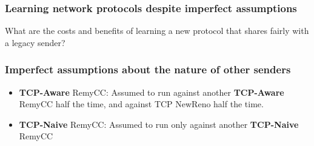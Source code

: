 \begin{frame}
\frametitle{Learning network protocols despite imperfect assumptions}
\begin{centering}
What are the costs and benefits of learning a new protocol that shares fairly with a legacy sender?
\end{centering}
\end{frame}

\begin{frame}
\frametitle{Imperfect assumptions about the nature of other senders}
\begin{itemize}
\item<1-> \textbf{TCP-Aware} RemyCC: Assumed to run against another \textbf{TCP-Aware} RemyCC half the time, and against TCP NewReno half the time.
\item<2-> \textbf{TCP-Naive} RemyCC: Assumed to run only against another \textbf{TCP-Naive} RemyCC
\end{itemize}
\end{frame}

